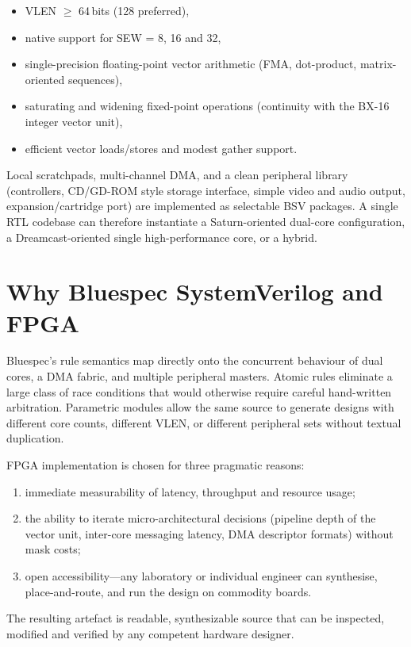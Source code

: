 \documentclass[11pt,a4paper]{article}
\begin{document}
\begin{itemize}[leftmargin=1.5em]
  \item VLEN $\ge$ 64\,bits (128 preferred),
  \item native support for SEW = 8, 16 and 32,
  \item single-precision floating-point vector arithmetic (FMA, dot-product, matrix-oriented sequences),
  \item saturating and widening fixed-point operations (continuity with the BX-16 integer vector unit),
  \item efficient vector loads/stores and modest gather support.
\end{itemize}

Local scratchpads, multi-channel DMA, and a clean peripheral library (controllers, CD/GD-ROM style storage interface, simple video and audio output, expansion/cartridge port) are implemented as selectable BSV packages. A single RTL codebase can therefore instantiate a Saturn-oriented dual-core configuration, a Dreamcast-oriented single high-performance core, or a hybrid.

\section{Why Bluespec SystemVerilog and FPGA}

Bluespec's rule semantics map directly onto the concurrent behaviour of dual cores, a DMA fabric, and multiple peripheral masters. Atomic rules eliminate a large class of race conditions that would otherwise require careful hand-written arbitration. Parametric modules allow the same source to generate designs with different core counts, different VLEN, or different peripheral sets without textual duplication.

FPGA implementation is chosen for three pragmatic reasons:
\begin{enumerate}[leftmargin=1.5em]
  \item immediate measurability of latency, throughput and resource usage;
  \item the ability to iterate micro-architectural decisions (pipeline depth of the vector unit, inter-core messaging latency, DMA descriptor formats) without mask costs;
  \item open accessibility---any laboratory or individual engineer can synthesise, place-and-route, and run the design on commodity boards.
\end{enumerate}

The resulting artefact is readable, synthesizable source that can be inspected, modified and verified by any competent hardware designer.
\end{document}
